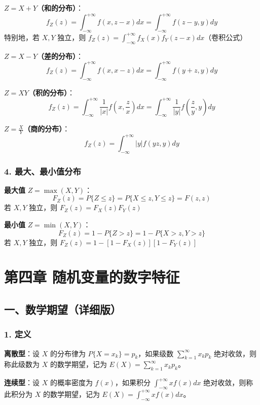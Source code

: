 \documentclass[12pt,a4paper]{ctexart}
\begin{document}
\textbf{$Z = X + Y$（和的分布）}：
\[
    f_Z(z) = \int_{-\infty}^{+\infty} f(x, z-x) dx = \int_{-\infty}^{+\infty} f(z-y, y) dy
\]
特别地，若 $X, Y$ 独立，则 $f_Z(z) = \int_{-\infty}^{+\infty} f_X(x) f_Y(z-x) dx$（卷积公式）

\textbf{$Z = X - Y$（差的分布）}：
\[
    f_Z(z) = \int_{-\infty}^{+\infty} f(x, x-z) dx = \int_{-\infty}^{+\infty} f(y+z, y) dy
\]

\textbf{$Z = XY$（积的分布）}：
\[
    f_Z(z) = \int_{-\infty}^{+\infty} \frac{1}{|x|} f\left(x, \frac{z}{x}\right) dx = \int_{-\infty}^{+\infty} \frac{1}{|y|} f\left(\frac{z}{y}, y\right) dy
\]

\textbf{$Z = \frac{X}{Y}$（商的分布）}：
\[
    f_Z(z) = \int_{-\infty}^{+\infty} |y| f(yz, y) dy
\]

\subsubsection{4. 最大、最小值分布}
\textbf{最大值} $Z = \max(X, Y)$：
\[
    F_Z(z) = P\{Z \le z\} = P\{X \le z, Y \le z\} = F(z, z)
\]
若 $X, Y$ 独立，则 $F_Z(z) = F_X(z) F_Y(z)$

\textbf{最小值} $Z = \min(X, Y)$：
\[
    F_Z(z) = 1 - P\{Z > z\} = 1 - P\{X > z, Y > z\}
\]
若 $X, Y$ 独立，则 $F_Z(z) = 1 - [1 - F_X(z)][1 - F_Y(z)]$

\newpage
\section{第四章 随机变量的数字特征}

\subsection{一、数学期望（详细版）}

\subsubsection{1. 定义}
\textbf{离散型}：设 $X$ 的分布律为 $P\{X = x_k\} = p_k$，如果级数 $\sum_{k=1}^\infty x_k p_k$ 绝对收敛，则称此级数为 $X$ 的数学期望，记为 $E(X) = \sum_{k=1}^\infty x_k p_k$。

\textbf{连续型}：设 $X$ 的概率密度为 $f(x)$，如果积分 $\int_{-\infty}^{+\infty} x f(x) dx$ 绝对收敛，则称此积分为 $X$ 的数学期望，记为 $E(X) = \int_{-\infty}^{+\infty} x f(x) dx$。
\end{document}
